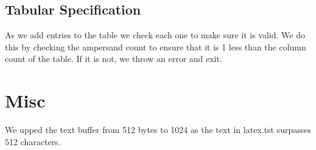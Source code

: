 \subsection{Tabular Specification}
As we add entries to the table we check each one to make sure it is valid. We do this by
checking the ampersand count to ensure that it is 1 less than the column count of the
table. If it is not, we throw an error and exit.

\section{Misc}
We upped the text buffer from 512 bytes to 1024 as the text in latex.tst surpasses 512
characters.

